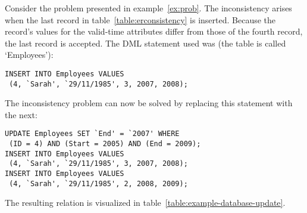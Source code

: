 \begin{example}
Consider the problem presented in example~\ref{ex:prob}. The inconsistency arises when the last record in table~\ref{table:erconsistency} is inserted. Because the record's values for the valid-time attributes differ from those of the fourth record, the last record is accepted. The DML statement used was (the table is called `Employees'):

\begin{verbatim}
INSERT INTO Employees VALUES
 (4, `Sarah', `29/11/1985', 3, 2007, 2008);
\end{verbatim}

The inconsistency problem can now be solved by replacing this statement with the next:

\begin{verbatim}
UPDATE Employees SET `End' = `2007' WHERE
 (ID = 4) AND (Start = 2005) AND (End = 2009);
INSERT INTO Employees VALUES
 (4, `Sarah', `29/11/1985', 3, 2007, 2008);
INSERT INTO Employees VALUES
 (4, `Sarah', `29/11/1985', 2, 2008, 2009);
\end{verbatim}

The resulting relation is visualized in table~\ref{table:example-database-update}.

\end{example}




